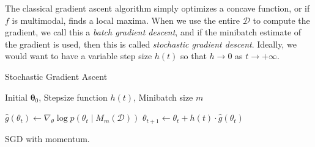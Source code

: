   The classical gradient ascent algorithm simply optimizes a concave function, or if $f$ is multimodal, finds a local maxima. When we use the entire $\mathcal{D}$ to compute the gradient, we call this a \textit{batch gradient descent}, and if the minibatch estimate of the gradient is used, then this is called \textit{stochastic gradient descent}. Ideally, we would want to have a variable step size $h(t)$ so that $h \rightarrow 0$ as $t \rightarrow + \infty$. 

  \begin{algorithm}
    \caption{Stochastic Gradient Ascent}\label{alg:sgd}
    \begin{algorithmic}

    \Require Initial $\boldsymbol{\theta}_0$, Stepsize function $h(t)$, Minibatch size $m$

        \State $\hat{g}(\theta_t) \gets \nabla_\theta \log{p(\theta_t \mid M_m(\mathcal{D}))}$
        \State $\theta_{t+1} \gets \theta_t + h(t) \cdot \hat{g}(\theta_t)$
    \EndFor

    \end{algorithmic}
  \end{algorithm}

  SGD with momentum. 

